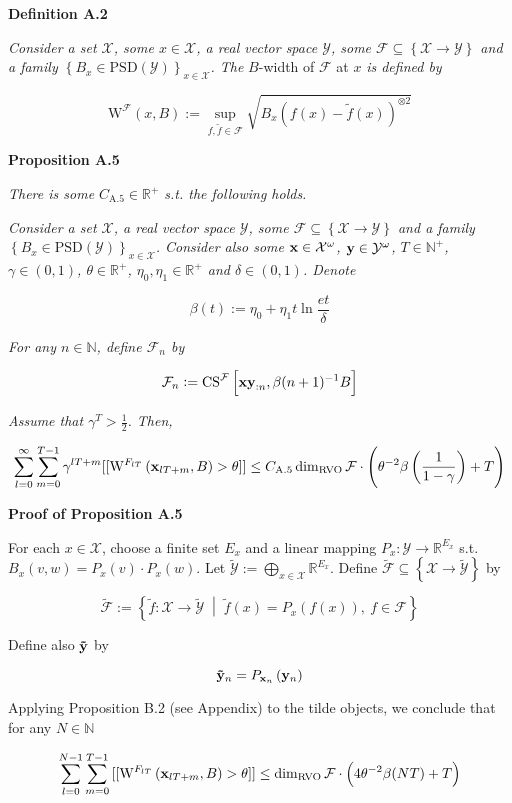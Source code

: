 \documentclass[a4paper]{article}
\newcommand{\Co}[1]{}
\newcommand{\AP}[1]{\left(#1\right)}
\newcommand{\AB}[1]{\left[#1\right]}
\newcommand{\AC}[1]{\left\{#1\right\}}
\newcommand{\ACM}[2]{\left\{#1\;\middle\vert\;#2\right\}}
\newcommand{\Nats}{\mathbb{N}}
\newcommand{\Reals}{\mathbb{R}}
\newcommand{\PSD}{\mathrm{PSD}}
\newcommand{\B}{B}
\newcommand{\X}{\mathcal{X}}
\newcommand{\Y}{\mathcal{Y}}
\newcommand{\F}{\mathcal{F}}
\DeclareMathOperator{\RVO}{\dim_{RVO}}
\newcommand{\CS}{\mathrm{CS}}
\newcommand{\W}{\mathrm{W}}
\begin{document}
\Co{b}

\textbf{Definition A.2}\Co{b}

\textit{Consider a set $\X$, some $x\in\X$, a real vector space $\Y$, some $\F\subseteq\AC{\X\rightarrow\Y}$ and a family $\AC{\B _x\in\PSD(\Y)}_{x\in\X}$. The}\Co{i} $\B $-width of $\F$ at $x$ \textit{is defined by}\Co{i}

$$\W^\F(x,B):=\sup_{f,\tilde{f}\in\F}\sqrt{\B _x\AP{f(x)-\tilde{f}(x)}^{\otimes2}}$$  

\textbf{Proposition A.5}\Co{b}

\textit{There is some $C_{\mathrm{A.5}}\in\Reals^+$ s.t. the following holds.}\Co{i}

\textit{Consider a set $\X$, a real vector space $\Y$, some $\F\subseteq\AC{\X\rightarrow\Y}$ and a family $\AC{\B _x\in\PSD(\Y)}_{x\in\X}$. Consider also some $\bold{x}\in\X^\omega$, $\bold{y}\in\Y^\omega$, $T\in\Nats^+$, $\gamma\in(0,1)$, $\theta\in\Reals^+$, $\eta_0,\eta_1\in\Reals^+$ and $\delta\in(0,1)$. Denote}\Co{i}

$$\beta(t):=\eta_0 + \eta_1t\ln{\frac{et}{\delta}}$$

\textit{For any $n\in\Nats$, define $\F_n$ by}\Co{i}

$$\F_n:=\CS^\F\AB{\bold{xy}_{:n},\beta(n+1)^{-1}\B}$$

\textit{Assume that $\gamma^T>\frac{1}{2}$. Then,}\Co{i}

$$\sum_{l=0}^\infty\sum_{m=0}^{T-1}{\gamma^{lT+m}[[\W^{F_{lT}}\AP{\bold{x}_{lT+m},B}>\theta]]} \leq C_{\mathrm{A.5}}\RVO{\F}\cdot\AP{\theta^{-2}\beta\AP{\frac{1}{1-\gamma}}+T}$$

\textbf{Proof of Proposition A.5}\Co{b}
 
For each $x\in\X$, choose a finite set $E_x$ and a linear mapping $P_x:\Y\rightarrow\Reals^{E_x}$ s.t. $B_x\AP{v,w}=P_x(v)\cdot P_x(w)$. Let $\tilde{\Y}:=\bigoplus_{x\in\X}\Reals^{E_x}$. Define $\tilde{\F}\subseteq\AC{\X\rightarrow\tilde{\Y}}$ by

$$\tilde{\F}:=\ACM{\tilde{f}:\X\rightarrow\tilde{\Y}}{\tilde{f}(x)=P_x\AP{f(x)},\ f\in\F}$$

Define also $\bold{\tilde{y}}$ by

$$\bold{\tilde{y}}_n=P_{\bold{x}_n}\AP{\bold{y}_n}$$

Applying Proposition B.2 (see Appendix) to the tilde objects, we conclude that for any $N\in\Nats$

$$\sum_{l=0}^{N-1}\sum_{m=0}^{T-1}{[[\W^{F_{lT}}\AP{\bold{x}_{lT+m},\B}>\theta]]} \leq \RVO{\F}\cdot\AP{4\theta^{-2}\beta(NT)+T}$$
\end{document}
